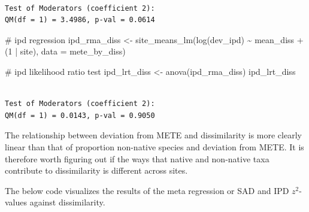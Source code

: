 \documentclass[
  letterpaper,
  DIV=11,
  numbers=noendperiod]{scrartcl}
\newenvironment{Shaded}{\begin{snugshade}}{\end{snugshade}}
\newcommand{\AttributeTok}[1]{\textcolor[rgb]{0.40,0.45,0.13}{#1}}
\newcommand{\CommentTok}[1]{\textcolor[rgb]{0.37,0.37,0.37}{#1}}
\newcommand{\DecValTok}[1]{\textcolor[rgb]{0.68,0.00,0.00}{#1}}
\newcommand{\FunctionTok}[1]{\textcolor[rgb]{0.28,0.35,0.67}{#1}}
\newcommand{\NormalTok}[1]{\textcolor[rgb]{0.00,0.23,0.31}{#1}}
\newcommand{\OtherTok}[1]{\textcolor[rgb]{0.00,0.23,0.31}{#1}}
\newcommand{\SpecialCharTok}[1]{\textcolor[rgb]{0.37,0.37,0.37}{#1}}
\begin{document}
\begin{verbatim}

Test of Moderators (coefficient 2):
QM(df = 1) = 3.4986, p-val = 0.0614
\end{verbatim}

\begin{Shaded}
\begin{Highlighting}[]
\CommentTok{\# ipd regression }
\NormalTok{ipd\_rma\_diss }\OtherTok{\textless{}{-}} \FunctionTok{site\_means\_lm}\NormalTok{(}\FunctionTok{log}\NormalTok{(dev\_ipd) }\SpecialCharTok{\textasciitilde{}}\NormalTok{ mean\_diss }\SpecialCharTok{+}\NormalTok{ (}\DecValTok{1} \SpecialCharTok{|}\NormalTok{ site),}
                              \AttributeTok{data =}\NormalTok{ mete\_by\_diss)}

\CommentTok{\# ipd likelihood ratio test}
\NormalTok{ipd\_lrt\_diss }\OtherTok{\textless{}{-}} \FunctionTok{anova}\NormalTok{(ipd\_rma\_diss)}
\NormalTok{ipd\_lrt\_diss}
\end{Highlighting}
\end{Shaded}

\begin{verbatim}

Test of Moderators (coefficient 2):
QM(df = 1) = 0.0143, p-val = 0.9050
\end{verbatim}

The relationship between deviation from METE and dissimilarity is more
clearly linear than that of proportion non-native species and deviation
from METE. It is therefore worth figuring out if the ways that native
and non-native taxa contribute to dissimilarity is different across
sites.

The below code visualizes the results of the meta regression or SAD and
IPD \(z^2\)-values against dissimilarity.
\end{document}
